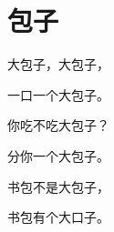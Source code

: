\documentclass[12pt,UTF-8,openany]{ctexbook}
\begin{document}
\begin{center}
    
\end{center}


\hanzibox{}\hanzibox{}\hanzibox{}\hanzibox{}\hspace{1em}\hanzibox{}\hanzibox{}\hanzibox{}\hanzibox{}

\hanzibox{}\hanzibox{}\hanzibox{}\hanzibox{}\hspace{1em}\hanzibox{}\hanzibox{}\hanzibox{}\hanzibox{}

\hanzibox{}\hanzibox{}\hanzibox{}\hanzibox{}\hspace{1em}




\chapter{包子}

\begin{large}
    
    大包子，大包子，
    
    一口一个大包子。
    
    你吃不吃大包子？
    
    分你一个大包子。
    
    书包不是大包子，
    
    书包有个大口子。
    
\end{large}


\clearpage

\begin{center}
    
\end{center}


\hanzibox{}\hanzibox{}\hanzibox{}\hanzibox{}\hspace{1em}\hanzibox{}\hanzibox{}\hanzibox{}\hanzibox{}

\hanzibox{}\hanzibox{}\hanzibox{}\hanzibox{}\hspace{1em}\hanzibox{}\hanzibox{}\hanzibox{}\hanzibox{}

\hanzibox{}\hanzibox{}\hanzibox{}\hanzibox{}\hspace{1em}
\end{document}
